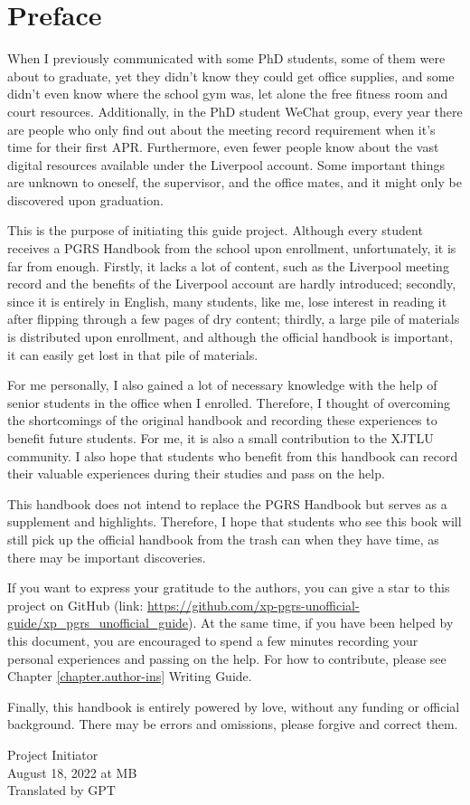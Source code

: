 \chapter{Preface}
\thispagestyle{empty}
When I previously communicated with some PhD students, some of them were about to graduate, yet they didn't know they could get office supplies, and some didn't even know where the school gym was, let alone the free fitness room and court resources. Additionally, in the PhD student WeChat group, every year there are people who only find out about the meeting record requirement when it's time for their first APR. Furthermore, even fewer people know about the vast digital resources available under the Liverpool account. Some important things are unknown to oneself, the supervisor, and the office mates, and it might only be discovered upon graduation.

This is the purpose of initiating this guide project. Although every student receives a PGRS Handbook from the school upon enrollment, unfortunately, it is far from enough. Firstly, it lacks a lot of content, such as the Liverpool meeting record and the benefits of the Liverpool account are hardly introduced; secondly, since it is entirely in English, many students, like me, lose interest in reading it after flipping through a few pages of dry content; thirdly, a large pile of materials is distributed upon enrollment, and although the official handbook is important, it can easily get lost in that pile of materials.

For me personally, I also gained a lot of necessary knowledge with the help of senior students in the office when I enrolled. Therefore, I thought of overcoming the shortcomings of the original handbook and recording these experiences to benefit future students. For me, it is also a small contribution to the XJTLU community. I also hope that students who benefit from this handbook can record their valuable experiences during their studies and pass on the help.

This handbook does not intend to replace the PGRS Handbook but serves as a supplement and highlights. Therefore, I hope that students who see this book will still pick up the official handbook from the trash can when they have time, as there may be important discoveries.

If you want to express your gratitude to the authors, you can give a star to this project on GitHub (link: \url{https://github.com/xp-pgrs-unofficial-guide/xp_pgrs_unofficial_guide}). At the same time, if you have been helped by this document, you are encouraged to spend a few minutes recording your personal experiences and passing on the help. For how to contribute, please see Chapter \ref{chapter.author-ins} Writing Guide.

Finally, this handbook is entirely powered by love, without any funding or official background. There may be errors and omissions, please forgive and correct them.

\begin{flushright}
Project Initiator \KW \\
August 18, 2022 at MB \\
Translated by GPT
\end{flushright}


